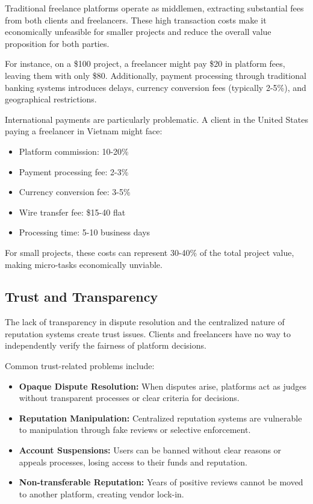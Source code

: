 \documentclass[a4paper,13pt,twoside]{report}
\theoremstyle{definition}
\begin{document}
Traditional freelance platforms operate as middlemen, extracting substantial fees from both clients and freelancers. These high transaction costs make it economically unfeasible for smaller projects and reduce the overall value proposition for both parties.

For instance, on a \$100 project, a freelancer might pay \$20 in platform fees, leaving them with only \$80. Additionally, payment processing through traditional banking systems introduces delays, currency conversion fees (typically 2-5\%), and geographical restrictions.

International payments are particularly problematic. A client in the United States paying a freelancer in Vietnam might face:
\begin{itemize}
    \item Platform commission: 10-20\%
    \item Payment processing fee: 2-3\%
    \item Currency conversion fee: 3-5\%
    \item Wire transfer fee: \$15-40 flat
    \item Processing time: 5-10 business days
\end{itemize}

For small projects, these costs can represent 30-40\% of the total project value, making micro-tasks economically unviable.

\subsection{Trust and Transparency}

The lack of transparency in dispute resolution and the centralized nature of reputation systems create trust issues. Clients and freelancers have no way to independently verify the fairness of platform decisions.

Common trust-related problems include:

\begin{itemize}
    \item \textbf{Opaque Dispute Resolution:} When disputes arise, platforms act as judges without transparent processes or clear criteria for decisions.

    \item \textbf{Reputation Manipulation:} Centralized reputation systems are vulnerable to manipulation through fake reviews or selective enforcement.

    \item \textbf{Account Suspensions:} Users can be banned without clear reasons or appeals processes, losing access to their funds and reputation.

    \item \textbf{Non-transferable Reputation:} Years of positive reviews cannot be moved to another platform, creating vendor lock-in.
\end{itemize}
\end{document}
